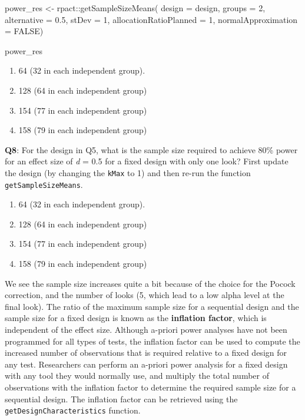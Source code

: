 \documentclass[
  oneside]{book}
\newenvironment{Shaded}{\begin{snugshade}}{\end{snugshade}}
\newcommand{\AttributeTok}[1]{\textcolor[rgb]{0.77,0.63,0.00}{#1}}
\newcommand{\ConstantTok}[1]{\textcolor[rgb]{0.00,0.00,0.00}{#1}}
\newcommand{\DecValTok}[1]{\textcolor[rgb]{0.00,0.00,0.81}{#1}}
\newcommand{\FloatTok}[1]{\textcolor[rgb]{0.00,0.00,0.81}{#1}}
\newcommand{\FunctionTok}[1]{\textcolor[rgb]{0.00,0.00,0.00}{#1}}
\newcommand{\NormalTok}[1]{#1}
\newcommand{\OtherTok}[1]{\textcolor[rgb]{0.56,0.35,0.01}{#1}}
\newcommand{\SpecialCharTok}[1]{\textcolor[rgb]{0.00,0.00,0.00}{#1}}
\providecommand{\tightlist}{%
  \setlength{\itemsep}{0pt}\setlength{\parskip}{0pt}}
\begin{document}
\begin{Shaded}
\begin{Highlighting}[]
\NormalTok{power\_res }\OtherTok{\textless{}{-}}\NormalTok{ rpact}\SpecialCharTok{::}\FunctionTok{getSampleSizeMeans}\NormalTok{(}
  \AttributeTok{design =}\NormalTok{ design,}
  \AttributeTok{groups =} \DecValTok{2}\NormalTok{,}
  \AttributeTok{alternative =} \FloatTok{0.5}\NormalTok{, }
  \AttributeTok{stDev =} \DecValTok{1}\NormalTok{, }
  \AttributeTok{allocationRatioPlanned =} \DecValTok{1}\NormalTok{,}
  \AttributeTok{normalApproximation =} \ConstantTok{FALSE}\NormalTok{)}

\NormalTok{power\_res}
\end{Highlighting}
\end{Shaded}

\begin{enumerate}
\def\labelenumi{\Alph{enumi})}
\tightlist
\item
  64 (32 in each independent group).
\item
  128 (64 in each independent group)
\item
  154 (77 in each independent group)
\item
  158 (79 in each independent group)
\end{enumerate}

\textbf{Q8}: For the design in Q5, what is the sample size required to achieve 80\% power for an effect size of \emph{d} = 0.5 for a fixed design with only one look? First update the design (by changing the \texttt{kMax} to 1) and then re-run the function \texttt{getSampleSizeMeans}.

\begin{enumerate}
\def\labelenumi{\Alph{enumi})}
\tightlist
\item
  64 (32 in each independent group).
\item
  128 (64 in each independent group)
\item
  154 (77 in each independent group)
\item
  158 (79 in each independent group)
\end{enumerate}

We see the sample size increases quite a bit because of the choice for the Pocock correction, and the number of looks (5, which lead to a low alpha level at the final look). The ratio of the maximum sample size for a sequential design and the sample size for a fixed design is known as the \textbf{inflation factor}, which is independent of the effect size. Although a-priori power analyses have not been programmed for all types of tests, the inflation factor can be used to compute the increased number of observations that is required relative to a fixed design for any test. Researchers can perform an a-priori power analysis for a fixed design with any tool they would normally use, and multiply the total number of observations with the inflation factor to determine the required sample size for a sequential design. The inflation factor can be retrieved using the \texttt{getDesignCharacteristics} function.
\end{document}
